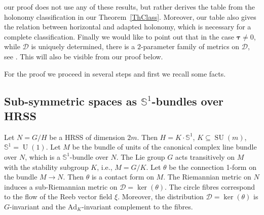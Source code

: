 \documentclass{amsart}
\theoremstyle{plain}
\theoremstyle{definition}
\newcommand{\SU}{\operatorname{SU}}
\newcommand{\Un}{\operatorname{U}}
\newcommand{\bt}{{\boldsymbol{\tau}}}
\newcommand{\1}{\mathbf{1}}
\newcommand{\D}{{\mathcal D}}
\newcommand{\+}{\oplus}
\begin{document}
  our proof does not use any of these results, but rather derives the table from the holonomy classification in our Theorem~\ref{ThClass}. Moreover, our table also gives the relation between horizontal and adapted holonomy, which is necessary for a complete classification.  Finally we would like to point out that in the case $\bt\neq 0$, while $\D$ is uniquely determined, there is a $2$-parameter family of metrics on $\D$, see  \cite[Theorem~6.1]{FGR}. This will also be visible from our proof below. 
  
%
%
%
%
%



 




\medskip





For the proof we proceed in several steps and 
first we recall some facts.

\subsection{Sub-symmetric spaces as $\mathbb{S}^1$-bundles over HRSS} 
Let $N=G/H$ be a HRSS of dimension $2m$. Then $H=K\cdot \mathbb{S}^1$, $K\subseteq\SU(m)$, $\mathbb{S}^1=\Un(1)$. Let $M$  be the bundle of units of the canonical complex line bundle over $N$, which is a $\mathbb{S}^1$-bundle over $N$.
 The Lie group $G$ acts transitively on $M$ with the stability subgroup $K$, i.e., $M= G/K$. Let $\theta$ be the connection 1-form on
 the bundle $M\to N$. Then $\theta$ is a contact form on $M$. The Riemannian metric on $N$ induces a sub-Riemannian metric on  $\D=\ker(\theta)$. 
 The circle fibres  correspond to the flow of the Reeb vector field $\xi$. 
Moreover, the distribution $\D=\ker(\theta)$ is $G$-invariant and the $\mathrm{Ad}_K$-invariant complement to the fibres. 
\end{document}
